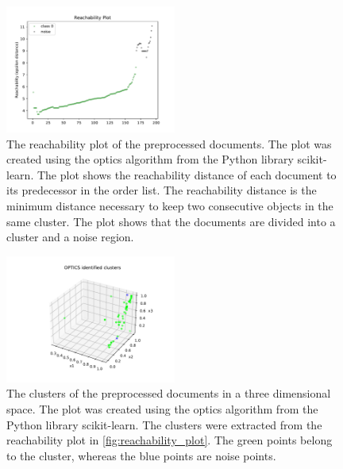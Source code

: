 \begin{figure}[htp] %
    \centering
    \includegraphics[width=0.5\textwidth]{images/reachability_plot.pdf}
    \caption{The reachability plot of the preprocessed documents.
    The plot was created using the \ac{optics} algorithm from the Python library scikit-learn.
    The plot shows the reachability distance of each document to its predecessor in the order list.
    The reachability distance is the minimum distance necessary to keep two consecutive objects in the same cluster.
    The plot shows that the documents are divided into a cluster and a noise region.
    }
    \label{fig:reachability_plot}
\end{figure}


\begin{figure}[htp] %
    \centering
    \includegraphics[width=0.5\textwidth]{images/OPTICS_cluster.pdf}
    \caption{The clusters of the preprocessed documents in a three dimensional space.
    The plot was created using the \ac{optics} algorithm from the Python library scikit-learn.
    The clusters were extracted from the reachability plot in \autoref{fig:reachability_plot}.
    The green points belong to the cluster, whereas the blue points are noise points.
    }
    \label{fig:optics_cluster}
\end{figure}

